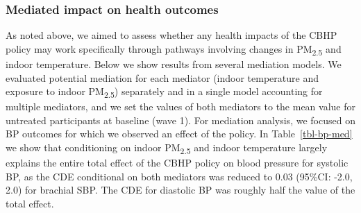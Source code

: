 \documentclass[
  letterpaper,
  DIV=11,
  numbers=noendperiod]{scrartcl}
\begin{document}
\subsubsection{Mediated impact on health
outcomes}\label{mediated-impact-on-health-outcomes}

As noted above, we aimed to assess whether any health impacts of the
CBHP policy may work specifically through pathways involving changes in
PM\textsubscript{2.5} and indoor temperature. Below we show results from
several mediation models. We evaluated potential mediation for each
mediator (indoor temperature and exposure to indoor
PM\textsubscript{2.5}) separately and in a single model accounting for
multiple mediators, and we set the values of both mediators to the mean
value for untreated participants at baseline (wave 1). For mediation
analysis, we focused on BP outcomes for which we observed an effect of
the policy. In Table~\ref{tbl-bp-med} we show that conditioning on
indoor PM\textsubscript{2.5} and indoor temperature largely explains the
entire total effect of the CBHP policy on blood pressure for systolic
BP, as the CDE conditional on both mediators was reduced to 0.03
(95\%CI: -2.0, 2.0) for brachial SBP. The CDE for diastolic BP was
roughly half the value of the total effect.
\end{document}
